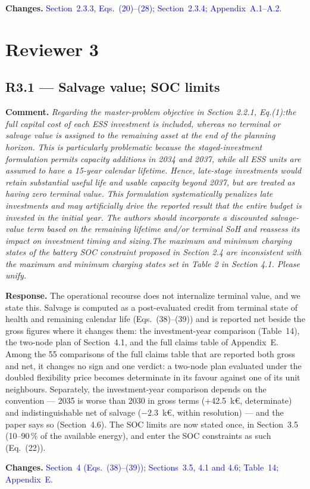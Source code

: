 \documentclass[11pt]{article}
\newcommand{\rcomment}[1]{\par\medskip\noindent\textbf{Comment.} \textit{#1}\par\smallskip}
\newcommand{\rresponse}[1]{\noindent\textbf{Response.} #1\par\smallskip}
\newcommand{\rchanges}[1]{\noindent\textbf{Changes.} \textcolor{blue}{#1}\par\medskip}
\begin{document}
\rchanges{
    Section~2.3.3, Eqs.~(20)--(28); Section~2.3.4; Appendix~A.1--A.2.
}

\section*{Reviewer 3}

\subsection*{R3.1 --- Salvage value; SOC limits}
\rcomment{
Regarding the master-problem objective in Section 2.2.1, Eq.(1):the full capital cost of each ESS investment is included, whereas no terminal or salvage value is assigned to the remaining asset at the end of the planning horizon. This is particularly problematic because the staged-investment formulation permits capacity additions in 2034 and 2037, while all ESS units are assumed to have a 15-year calendar lifetime. Hence, late-stage investments would retain substantial useful life and usable capacity beyond 2037, but are treated as having zero terminal value. This formulation systematically penalizes late investments and may artificially drive the reported result that the entire budget is invested in the initial year. The authors should incorporate a discounted salvage-value term based on the remaining lifetime and/or terminal SoH and reassess its impact on investment timing and sizing.The maximum and minimum charging states of the battery SOC constraint proposed in Section 2.4 are inconsistent with the maximum and minimum charging states set in Table 2 in Section 4.1. Please unify.
}
\rresponse{The operational recourse does not internalize terminal value, and we state this. Salvage is computed as a post-evaluated credit from terminal state of health and remaining calendar life (Eqs.~(38)--(39)) and is reported net beside the gross figures where it changes them: the investment-year comparison (Table~14), the two-node plan of Section~4.1, and the full claims table of Appendix~E. 
Among the 55 comparisons of the full claims table that are reported both gross and net, it changes no sign and one verdict: a two-node plan evaluated under the doubled flexibility price becomes determinate in its favour against one of its unit neighbours. Separately, the investment-year comparison depends on the convention --- 2035 is worse than 2030 in gross terms (+42.5~k\euro{}, determinate) and indistinguishable net of salvage ($-2.3$~k\euro{}, within resolution) --- and the paper says so (Section~4.6). The SOC limits are now stated once, in Section~3.5 (10--90\,\% of the available energy), and enter the SOC constraints as such (Eq.~(22)).}
\rchanges{Section~4 (Eqs.~(38)--(39)); Sections~3.5, 4.1 and 4.6; Table~14; Appendix~E.}
\end{document}
